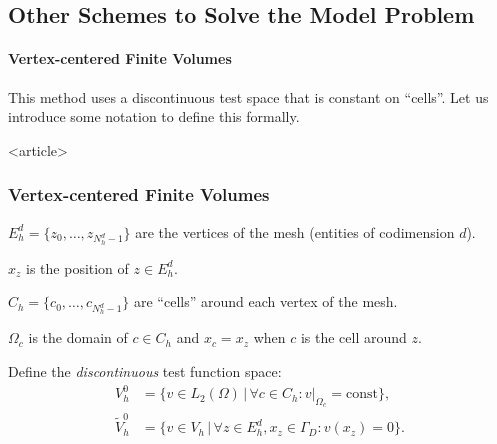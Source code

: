\subsection{Other Schemes to Solve the Model Problem}

\paragraph{Vertex-centered Finite Volumes}

This method uses a discontinuous test space that is constant on
``cells''. Let us introduce some notation to define this formally.

\begin{onlyenv}<article>
\frametitle<presentation>{Vertex-centered Finite Volumes}
\begin{window}
$E_h^d=\{z_0,\ldots,z_{N_h^d-1}\}$ are the vertices of the mesh
(entities of codimension $d$). 

$x_z$ is the position of $z\in E_h^d$.

$C_h = \{c_0,\ldots,c_{N_h^d-1}\}$ are ``cells'' around each vertex of
the mesh.
\end{window}

$\Omega_c$ is the domain of $c\in C_h$ and $x_c=x_z$ when $c$ is the
cell around $z$.

Define the \textit{discontinuous} test function space:
\begin{align*}
V_h^0 & = \{ v\in L_2(\Omega) \,|\, \forall c\in C_h : v|_{\Omega_c} =
\text{const} \},\\
\tilde{V}_h^0 &= \{ v\in V_h \,|\, \forall z\in E_h^d, x_z\in\Gamma_D : v(x_z)=0\}.
\end{align*}

\end{onlyenv}

